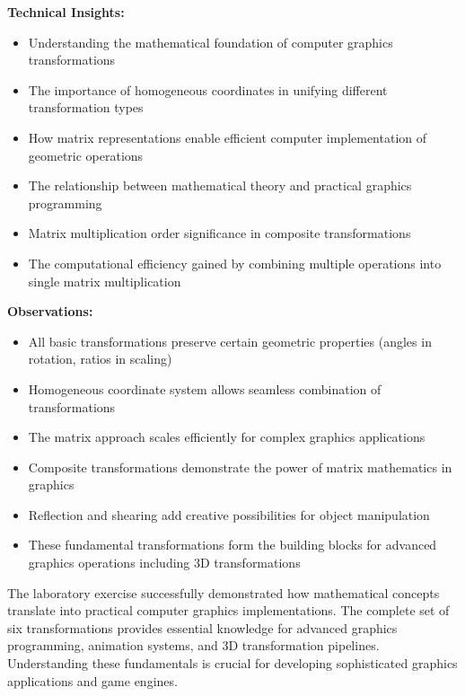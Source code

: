 \documentclass[12pt,a4paper]{article}
\begin{document}
\textbf{Technical Insights:}
\begin{itemize}
    \item Understanding the mathematical foundation of computer graphics transformations
    \item The importance of homogeneous coordinates in unifying different transformation types
    \item How matrix representations enable efficient computer implementation of geometric operations
    \item The relationship between mathematical theory and practical graphics programming
    \item Matrix multiplication order significance in composite transformations
    \item The computational efficiency gained by combining multiple operations into single matrix multiplication
\end{itemize}

\textbf{Observations:}
\begin{itemize}
    \item All basic transformations preserve certain geometric properties (angles in rotation, ratios in scaling)
    \item Homogeneous coordinate system allows seamless combination of transformations
    \item The matrix approach scales efficiently for complex graphics applications
    \item Composite transformations demonstrate the power of matrix mathematics in graphics
    \item Reflection and shearing add creative possibilities for object manipulation
    \item These fundamental transformations form the building blocks for advanced graphics operations including 3D transformations
\end{itemize}

The laboratory exercise successfully demonstrated how mathematical concepts translate into practical computer graphics implementations. The complete set of six transformations provides essential knowledge for advanced graphics programming, animation systems, and 3D transformation pipelines. Understanding these fundamentals is crucial for developing sophisticated graphics applications and game engines.
\end{document}
